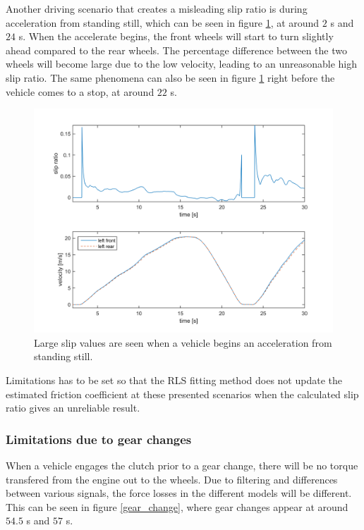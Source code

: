 Another driving scenario that creates a misleading slip ratio is during acceleration from standing still, which can be seen in figure \ref{slipratio_from_still}, at around $ 2 $ s and $ 24 $ s. When the accelerate begins, the front wheels will start to turn slightly ahead compared to the rear wheels. The percentage difference between the two wheels will become large due to the low velocity, leading to an unreasonable high slip ratio. The same phenomena can also be seen in figure \ref{slipratio_from_still} right before the vehicle comes to a stop, at around $ 22 $ s. 

\begin{figure}[h]
	\centering
	\includegraphics[width=1.0\textwidth]{Pictures/slipratio_from_still}
	\caption {Large slip values are seen when a vehicle begins an acceleration from standing still.}
	\label{slipratio_from_still}
\end{figure}

Limitations has to be set so that the RLS fitting method does not update the estimated friction coefficient at these presented scenarios when the calculated slip ratio gives an unreliable result.

\subsubsection{Limitations due to gear changes}
When a vehicle engages the clutch prior to a gear change, there will be no torque transfered from the engine out to the wheels. Due to filtering and differences between various signals, the force losses in the different models will be different. This can be seen in figure \ref{gear_change}, where gear changes appear at around $ 54.5 $ s and $ 57 $ s.

